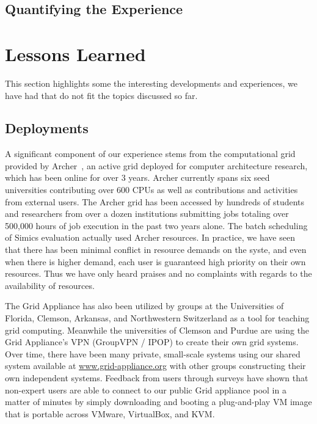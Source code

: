 \documentclass[twocolumn]{svjour3}
\begin{document}
\subsection{Quantifying the Experience}

\section{Lessons Learned}
\label{lessons_learned}

This section highlights some the interesting developments and experiences, we
have had that do not fit the topics discussed so far.  

\subsection{Deployments}

A significant component of our experience stems from the computational grid
provided by Archer~\cite{archer}, an active grid deployed for computer
architecture research, which has been online for over 3 years.  Archer
currently spans six seed universities contributing over 600 CPUs as well as
contributions and activities from external users.  The Archer grid has been
accessed by hundreds of students and researchers from over a dozen institutions
submitting jobs totaling over 500,000 hours of job execution in the past two
years alone.  The batch scheduling of Simics evaluation actually used Archer
resources.  In practice, we have seen that there has been minimal conflict in
resource demands on the syste, and even when there is higher demand, each user
is guaranteed high priority on their own resources.  Thus we have only heard
praises and no complaints with regards to the availability of resources.

The Grid Appliance has also been utilized by groups at the Universities of
Florida, Clemson, Arkansas, and Northwestern Switzerland as a tool for teaching
grid computing.  Meanwhile the universities of Clemson and Purdue are using the
Grid Appliance's VPN (GroupVPN / IPOP) to create their own grid systems.  Over
time, there have been many private, small-scale systems using our shared system
available at \url{www.grid-appliance.org} with other groups constructing their
own independent systems.  Feedback from users through surveys have shown that
non-expert users are able to connect to our public Grid appliance pool in a
matter of minutes by simply downloading and booting a plug-and-play VM image
that is portable across VMware, VirtualBox, and KVM.
\end{document}
